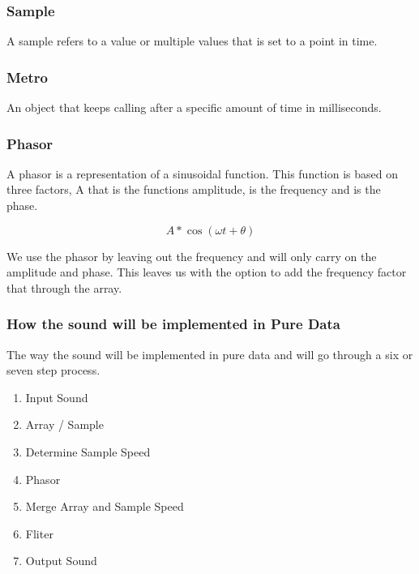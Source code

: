 

\subsubsection{Sample} %
\label{ssub:sample}

A sample refers to a value or multiple values that is set to a point in time.



\subsubsection{Metro} %
\label{ssub:metro}

An object that keeps calling after a specific amount of time in milliseconds.

    

\subsubsection{Phasor} %
\label{ssub:phasor}

A phasor is a representation of a sinusoidal function. 
This function is based on three factors, A that is the functions amplitude, is the frequency and  is the phase.  

\begin{equation}
    A * \cos(\omega t + \theta)
\end{equation}

We use the phasor by leaving out the frequency and will only carry on the amplitude and phase. 
This leaves us with the option to add the frequency factor that through the array.



\subsubsection{How the sound will be implemented in Pure Data} %
\label{ssub:how_the_sound_will_be_implemented_in_pure_data}

The way the sound will be implemented in pure data and will go through a six or seven step process.

\begin{enumerate}
    \item Input Sound
    \item Array / Sample
    \item Determine Sample Speed
    \item Phasor
    \item Merge Array and Sample Speed
    \item Fliter
    \item Output Sound
\end{enumerate}

